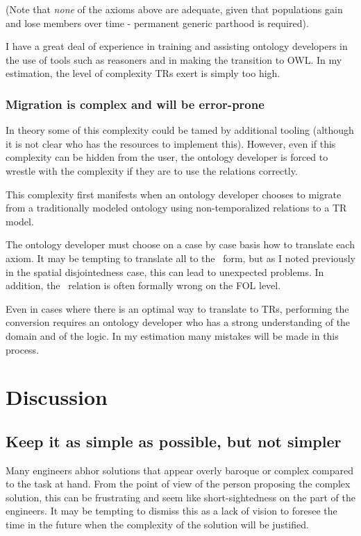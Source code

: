 \documentclass{bioinfo}
\def\atAllTimes{\pr{at-all-times}}
\begin{document}
(Note that \emph{none} of the axioms above are adequate, given that
populations gain and lose members over time - permanent generic
parthood is required).

I have a great deal of experience in training and assisting ontology
developers in the use of tools such as reasoners and in making the
transition to OWL. In my estimation, the level of complexity TRs exert
is simply too high.

\subsubsection{Migration is complex and will be error-prone}

In theory some of this complexity could be tamed by additional tooling
(although it is not clear who has the resources to implement
this). However, even if this complexity can be hidden from the user,
the ontology developer is forced to wrestle with the complexity if
they are to use the relations correctly.

This complexity first manifests when an ontology developer chooses to
migrate from a traditionally modeled ontology using non-temporalized
relations to a TR model.

The ontology developer must choose on a case by case basis how to
translate each axiom. It may be tempting to translate all to the
\atAllTimes\ form, but as I noted previously in the spatial
disjointedness case, this can lead to unexpected problems. In
addition, the \atAllTimes\ relation is often formally wrong on the FOL
level.

Even in cases where there is an optimal way to translate to TRs,
performing the conversion requires an ontology developer who has a
strong understanding of the domain and of the logic. In my estimation
many mistakes will be made in this process.


\section{Discussion}

\subsection{Keep it as simple as possible, but not simpler}

Many engineers abhor solutions that appear overly baroque or complex
compared to the task at hand. From the point of view of the person
proposing the complex solution, this can be frustrating and seem like
short-sightedness on the part of the engineers. It may be tempting to
dismiss this as a lack of vision to foresee the time in the future
when the complexity of the solution will be justified.
\end{document}
